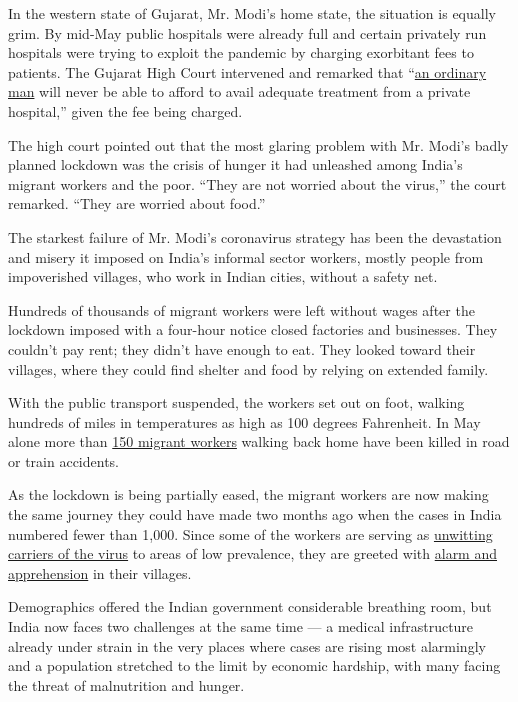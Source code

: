 In the western state of Gujarat, Mr. Modi's home state, the situation is
equally grim. By mid-May public hospitals were already full and certain
privately run hospitals were trying to exploit the pandemic by charging
exorbitant fees to patients. The Gujarat High Court intervened and
remarked that
``\href{https://www.livelaw.in/news-updates/gujarat-hc-directs-pvt-hospitals-to-adopt-govt-specified-rates-lest-license-be-cancelled-read-order-156959}{an
ordinary man} will never be able to afford to avail adequate treatment
from a private hospital,'' given the fee being charged.

The high court pointed out that the most glaring problem with Mr. Modi's
badly planned lockdown was the crisis of hunger it had unleashed among
India's migrant workers and the poor. ``They are not worried about the
virus,'' the court remarked. ``They are worried about food.''

The starkest failure of Mr. Modi's coronavirus strategy has been the
devastation and misery it imposed on India's informal sector workers,
mostly people from impoverished villages, who work in Indian cities,
without a safety net.

Hundreds of thousands of migrant workers were left without wages after
the lockdown imposed with a four-hour notice closed factories and
businesses. They couldn't pay rent; they didn't have enough to eat. They
looked toward their villages, where they could find shelter and food by
relying on extended family.

With the public transport suspended, the workers set out on foot,
walking hundreds of miles in temperatures as high as 100 degrees
Fahrenheit. In May alone more than
\href{https://thejeshgn.com/projects/covid19-india/non-virus-deaths/}{150
migrant workers} walking back home have been killed in road or train
accidents.

As the lockdown is being partially eased, the migrant workers are now
making the same journey they could have made two months ago when the
cases in India numbered fewer than 1,000. Since some of the workers are
serving as
\href{https://timesofindia.indiatimes.com/india/migrants-return-bring-home-the-virus/articleshow/75544708.cms}{unwitting
carriers of the virus} to areas of low prevalence, they are greeted with
\href{https://www.hindustantimes.com/india-news/migrant-workers-battle-stigma-bias-back-home/story-0uuRSEZfoickVOrPU2agGL.html}{alarm
and apprehension} in their villages.

Demographics offered the Indian government considerable breathing room,
but India now faces two challenges at the same time --- a medical
infrastructure already under strain in the very places where cases are
rising most alarmingly and a population stretched to the limit by
economic hardship, with many facing the threat of malnutrition and
hunger.


